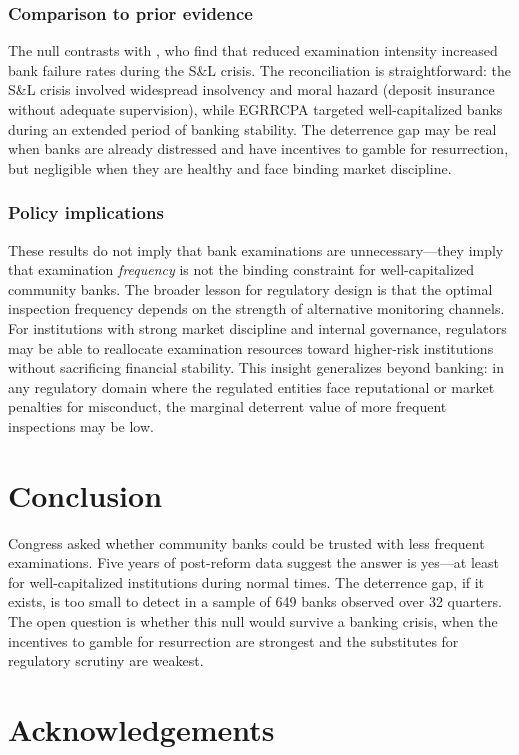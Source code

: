 \documentclass[12pt]{article}
\begin{document}
\subsubsection*{Comparison to prior evidence} The null contrasts with \citet{kandrac2021}, who find that reduced examination intensity increased bank failure rates during the S\&L crisis. The reconciliation is straightforward: the S\&L crisis involved widespread insolvency and moral hazard (deposit insurance without adequate supervision), while EGRRCPA targeted well-capitalized banks during an extended period of banking stability. The deterrence gap may be real when banks are already distressed and have incentives to gamble for resurrection, but negligible when they are healthy and face binding market discipline.

\subsubsection*{Policy implications} These results do not imply that bank examinations are unnecessary---they imply that examination \textit{frequency} is not the binding constraint for well-capitalized community banks. The broader lesson for regulatory design is that the optimal inspection frequency depends on the strength of alternative monitoring channels. For institutions with strong market discipline and internal governance, regulators may be able to reallocate examination resources toward higher-risk institutions without sacrificing financial stability. This insight generalizes beyond banking: in any regulatory domain where the regulated entities face reputational or market penalties for misconduct, the marginal deterrent value of more frequent inspections may be low.


\section{Conclusion}

Congress asked whether community banks could be trusted with less frequent examinations. Five years of post-reform data suggest the answer is yes---at least for well-capitalized institutions during normal times. The deterrence gap, if it exists, is too small to detect in a sample of 649 banks observed over 32 quarters. The open question is whether this null would survive a banking crisis, when the incentives to gamble for resurrection are strongest and the substitutes for regulatory scrutiny are weakest.


\section*{Acknowledgements}
\end{document}
